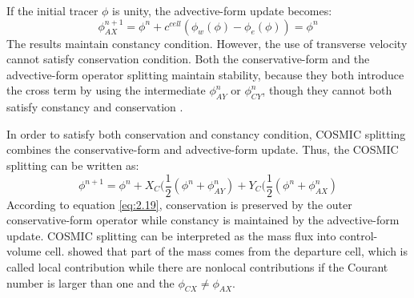 If the initial tracer $\phi $ is unity, the advective-form update becomes:
\begin{equation} \label{eq:2.18}
\phi^{n+1}_{\scriptscriptstyle AX} = \phi^{n}+c^{cell}(\phi_w(\phi )-\phi_e(\phi )) = \phi^{n}
\end{equation}
The results maintain constancy condition. However, the use of transverse velocity cannot satisfy conservation condition. Both the conservative-form and the advective-form operator splitting  maintain stability, because they both introduce the cross term by using the intermediate $\phi^{n}_{\scriptscriptstyle AY}$ or $\phi^{n}_{\scriptscriptstyle CY}$, though they cannot both satisfy constancy and conservation \citep{Leonard1996}.

In order to satisfy both conservation and constancy condition, COSMIC splitting \citep{Leonard1996} combines the conservative-form and advective-form update. Thus, the COSMIC splitting can be written as:
\begin{equation} \label{eq:2.19}
\phi^{n+1} = \phi^n+X_{\scriptscriptstyle C}(\frac{1}{2}(\phi^n + \phi^n _{\scriptscriptstyle AY}) +Y_{\scriptscriptstyle C}(\frac{1}{2}(\phi^n + \phi^n _{\scriptscriptstyle AX})
\end{equation}
According to equation \ref{eq:2.19}, conservation is preserved by the outer conservative-form operator while constancy is maintained by the advective-form update. COSMIC splitting can be interpreted as the mass flux into control-volume cell. \cite{Lauritzen2007} showed that part of the mass comes from the departure cell, which is called local contribution  while there are nonlocal contributions if the Courant number is larger than one and the $\phi_{CX} \neq \phi_{AX}$.
